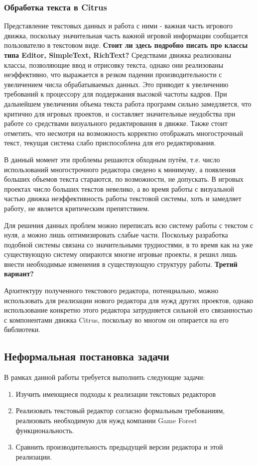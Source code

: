 \documentclass{fefu}
\begin{document}
			\subsubsection{Обработка текста в Citrus}
				\par Представление текстовых данных и работа с ними - важная часть игрового
				движка, поскольку значительная часть важной игровой информации сообщается 
				пользователю в текстовом виде. \textbf{Стоит ли здесь подробно писать про
				классы типа Editor, SimpleText, RichText?} Средствами движка реализованы 
				классы, позволяющие ввод и отрисовку текста, однако они реализованы
				неэффективно, что выражается в резком падении производительности с увеличением
				числа обрабатываемых данных. Это приводит к увеличению
				требований к процессору для поддержания высокой частоты кадров. При дальнейшем
				увеличении объема текста работа программ сильно замедляется, что критично для
				игровых проектов, и составляет значительные неудобства при работе со средствами
				визуального редактирования в движке. Также стоит отметить, что несмотря на
				возможность корректно отображать многострочный текст, текущая система слабо
				приспособлена для его редактирования.
				\par В данный момент эти проблемы решаются обходным путём, т.е. число
				использований многострочного редактора сведено к минимуму, а появления больших
				объемов текста стараются, по возможности, не допускать. В игровых проектах
				число больших текстов невелико, а во время работы с визуальной частью движка
				неэффективность работы текстовой системы, хоть и замедляет работу, не является
				критическим препятствием.
				\par Для решения данных проблем можно переписать всю систему работы с текстом с
				нуля, а можно лишь оптимизировать слабые части. Поскольку разработка подобной
				системы связана со значительными трудностями, в то время как на уже
				существующую систему опираются многие игровые проекты, я решил лишь внести 
				необходимые изменения в существующую структуру работы. \textbf{Третий вариант?}
				\par Архитектуру полученного текстового редактора, потенциально, можно
				использовать для реализации нового редактора для нужд других проектов, однако
				использование конкретно этого редактора затрудняется сильной его связанностью
				с компонентами движка Citrus, поскольку во многом он опирается на его
				библиотеки.	
		\subsection{Неформальная постановка задачи}
			В рамках данной работы требуется выполнить следующие задачи:
			\begin{enumerate}
				\item Изучить имеющиеся подходы к реализации текстовых редакторов
				\item Реализовать текстовый редактор согласно формальным требованиям,
				реализовать необходимую для нужд компании Game Forest функциональность.
				\item Сравнить производительность предыдущей версии редактора и этой 
				реализации.
			\end{enumerate}
\end{document}
